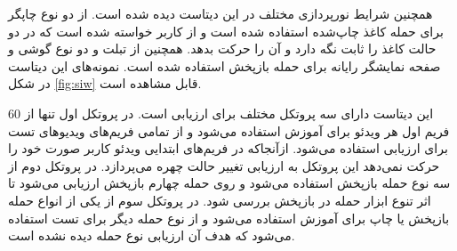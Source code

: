  همچنین شرایط نورپردازی مختلف در این دیتاست دیده شده است. از دو نوع چاپگر برای حمله کاغذ چاپ‌شده استفاده شده است و از کاربر خواسته شده است که در دو حالت کاغذ را ثابت نگه دارد و آن را حرکت بدهد. همچنین از تبلت و دو نوع گوشی و صفحه نمایشگر رایانه برای حمله بازپخش استفاده شده است. نمونه‌های این دیتاست در  شکل 
\ref{fig:siw}
قابل مشاهده است. 


این دیتاست دارای سه پروتکل مختلف برای ارزیابی است. در پروتکل اول تنها از 60 فریم اول هر ویدئو برای آموزش استفاده می‌شود و از تمامی فریم‌های ویدیوهای تست برای ارزیابی استفاده می‌شود. از‌آنجا‌که در فریم‌های ابتدایی ویدئو کاربر صورت خود را حرکت نمی‌دهد این پروتکل به ارزیابی تغییر حالت چهره می‌پردازد. در پروتکل دوم از سه نوع حمله بازپخش استفاده می‌شود و روی حمله چهارم بازپخش ارزیابی می‌شود تا اثر تنوع ابزار حمله در بازپخش بررسی شود. در پروتکل سوم از یکی از انواع حمله بازپخش یا چاپ برای آموزش استفاده می‌شود و از نوع حمله دیگر برای تست استفاده می‌شود که هدف آن ارزیابی نوع حمله دیده نشده است. 





 











 












